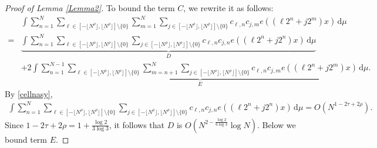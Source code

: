 \documentclass[amssymb,amsfonts,refcheck,12pt,verbatim,righttag]{amsart}
\numberwithin{equation}{section} %
\def\O{\mathcal{O}}
\theoremstyle{plain}
\begin{document}
\begin{proof}[Proof of Lemma \ref{Lemma2}]
	
	 To bound the term $C$, we rewrite it as follows:
	\begin{align*}
		&\int \sum_{n=1}^{N}\sum_{\ell\in [-\lfloor N^{\rho}\rfloor,\lfloor N^{ \rho}\rfloor]\setminus\{0\}}\sum_{m=1}^{N}\sum_{j\in [-\lfloor N^{\rho}\rfloor,\lfloor N^{ \rho}\rfloor]\setminus\{0\}}c_{\ell,n}c_{j,m}e((\ell 2^n+j2^m)x)\, \mathrm{d}\mu\\
		=&\underbrace{\int\sum_{n=1}^{N}\sum_{\ell \in [-\lfloor N^{\rho}\rfloor,\lfloor N^{ \rho}\rfloor]\setminus\{0\}}\sum_{j\in [-\lfloor N^{\rho}\rfloor,\lfloor N^{ \rho}\rfloor]\setminus\{0\}}c_{\ell,n}c_{j,n}e((\ell2^n+j2^n)x)\, \mathrm{d}\mu}_{D}\\
		&+2\underbrace{\int \sum_{n=1}^{N-1}\sum_{\ell \in [-\lfloor N^{ \rho}\rfloor,\lfloor N^{ \rho}\rfloor]\setminus\{0\}}\sum_{m=n+1}^{N}\sum_{j\in [-\lfloor N^{\rho}\rfloor,\lfloor N^{ \rho}\rfloor]\setminus\{0\}}c_{\ell,n}c_{j,m}e((\ell 2^n+j2^m)x)\, \mathrm{d}\mu}_{E}.
	\end{align*}
By \eqref{cellnasy},  
	\begin{equation*}
	\begin{aligned}
\int\sum_{n=1}^{N}\sum_{\ell\in [-\lfloor N^{ \rho}\rfloor,\lfloor N^{\rho}\rfloor]\setminus\{0\}}\sum_{j\in [-\lfloor N^{\rho}\rfloor,\lfloor N^{\rho}\rfloor]\setminus\{0\}}c_{\ell,n}c_{j,n}e((\ell 2^n+j2^n)x)\, \mathrm{d}\mu=O\left(N^{1-2\tau+2\rho}\right). 
   \end{aligned}
     \end{equation*}
    Since $1-2\tau+2\rho=1+\frac{\log2}{3\log3}$, it follows that $D$ is $O\left(N^{2-\frac{\log2}{6\log3}}\log N\right)$. Below we bound term $E$.
    

\end{proof}
\end{document}

